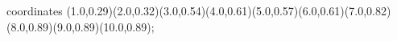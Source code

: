 					coordinates { (1.0,0.29)(2.0,0.32)(3.0,0.54)(4.0,0.61)(5.0,0.57)(6.0,0.61)(7.0,0.82)(8.0,0.89)(9.0,0.89)(10.0,0.89)};